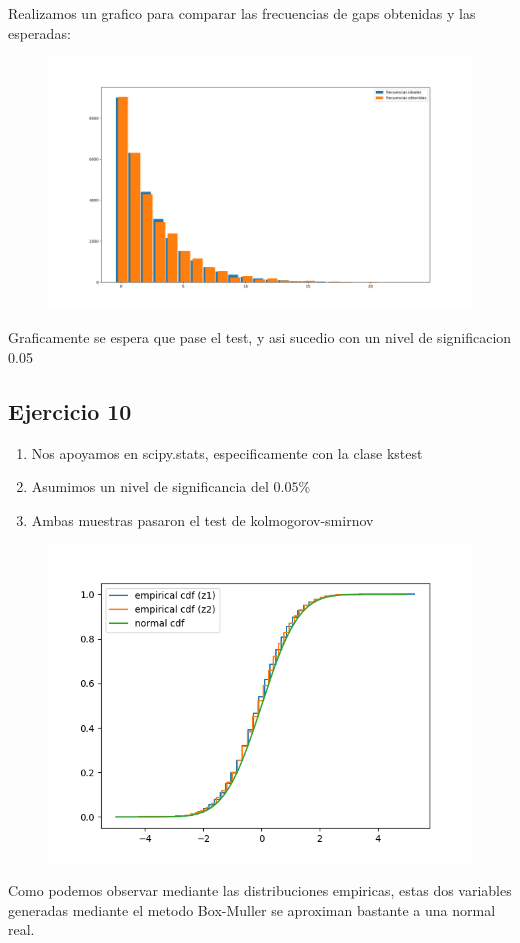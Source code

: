 \documentclass[11pt,a4paper]{article}
\begin{document}
	Realizamos un grafico para comparar las frecuencias de gaps obtenidas y las esperadas:
	\begin{figure}[H]
  		\centering
    		\includegraphics[width=14cm]{imagenes/ej9}
	\end{figure}
	
	Graficamente se espera que pase el test, y asi sucedio con un nivel de significacion 0.05
	\subsection{Ejercicio 10}
	\begin{enumerate}
		\item Nos apoyamos en scipy.stats, especificamente con la clase kstest
		\item Asumimos un nivel de significancia del $0.05$\%
		\item Ambas muestras pasaron el test de kolmogorov-smirnov
	\end{enumerate}
	\begin{figure}[H]
  		\centering
    		\includegraphics[width=14cm]{imagenes/10}
	\end{figure}
	Como podemos observar mediante las distribuciones empiricas, estas dos variables generadas mediante el metodo Box-Muller se aproximan bastante a una normal real.
\end{document}
